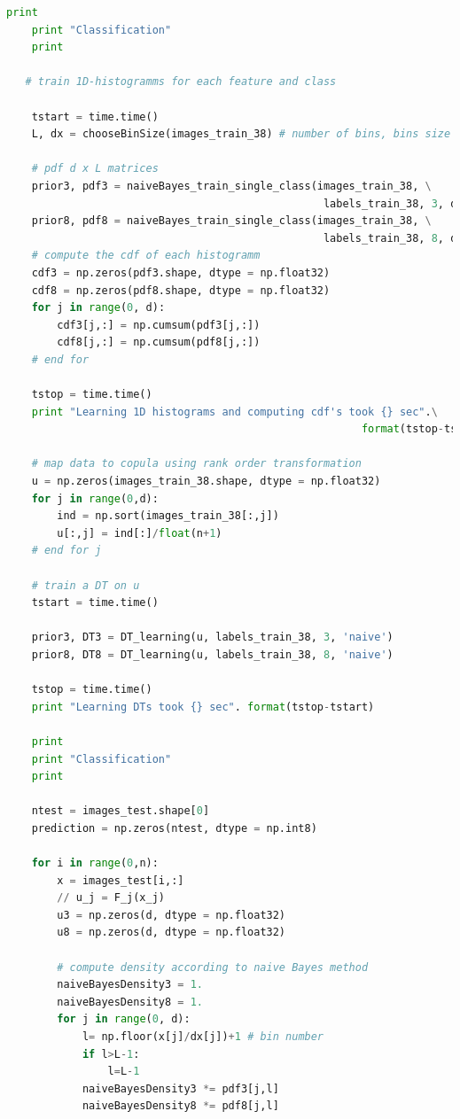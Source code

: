 \documentclass{article}
\begin{document}
\begin{lstlisting}[language=Python]
    print    
    print "Classification"
    print    
    
   # train 1D-histogramms for each feature and class      
    
    tstart = time.time() 
    L, dx = chooseBinSize(images_train_38) # number of bins, bins size
    
    # pdf d x L matrices                  
    prior3, pdf3 = naiveBayes_train_single_class(images_train_38, \
                                                  labels_train_38, 3, dx, L)    
    prior8, pdf8 = naiveBayes_train_single_class(images_train_38, \
                                                  labels_train_38, 8, dx, L)    
    # compute the cdf of each histogramm
    cdf3 = np.zeros(pdf3.shape, dtype = np.float32)   
    cdf8 = np.zeros(pdf8.shape, dtype = np.float32)   
    for j in range(0, d):
        cdf3[j,:] = np.cumsum(pdf3[j,:])
        cdf8[j,:] = np.cumsum(pdf8[j,:])
    # end for                                               

    tstop = time.time()
    print "Learning 1D histograms and computing cdf's took {} sec".\
                                                        format(tstop-tstart)
    
    # map data to copula using rank order transformation
    u = np.zeros(images_train_38.shape, dtype = np.float32)
    for j in range(0,d):
        ind = np.sort(images_train_38[:,j])
        u[:,j] = ind[:]/float(n+1)
    # end for j    
    
    # train a DT on u
    tstart = time.time() 
    
    prior3, DT3 = DT_learning(u, labels_train_38, 3, 'naive') 
    prior8, DT8 = DT_learning(u, labels_train_38, 8, 'naive') 
    
    tstop = time.time()
    print "Learning DTs took {} sec". format(tstop-tstart)    
    
    print    
    print "Classification"
    print    
    
    ntest = images_test.shape[0]
    prediction = np.zeros(ntest, dtype = np.int8)
        
    for i in range(0,n):
        x = images_test[i,:]
        // u_j = F_j(x_j) 
        u3 = np.zeros(d, dtype = np.float32)        
        u8 = np.zeros(d, dtype = np.float32)                
        
        # compute density according to naive Bayes method
        naiveBayesDensity3 = 1.
        naiveBayesDensity8 = 1.        
        for j in range(0, d):
            l= np.floor(x[j]/dx[j])+1 # bin number
            if l>L-1:
                l=L-1
            naiveBayesDensity3 *= pdf3[j,l]            
            naiveBayesDensity8 *= pdf8[j,l]                      
            

\end{lstlisting}
\end{document}
